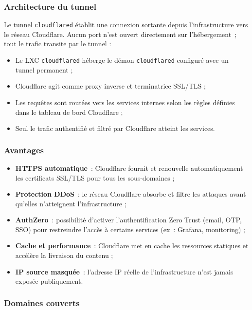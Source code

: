 \subsubsection{Architecture du tunnel}

Le tunnel \texttt{cloudflared} établit une connexion sortante depuis
l'infrastructure vers le réseau Cloudflare. Aucun port n'est ouvert
directement sur l'hébergement~; tout le trafic transite par le tunnel :

\begin{itemize}
  \item Le LXC \texttt{cloudflared} héberge le démon \texttt{cloudflared}
    configuré avec un tunnel permanent ;
  \item Cloudflare agit comme proxy inverse et terminatrice SSL/TLS ;
  \item Les requêtes sont routées vers les services internes selon les
    règles définies dans le tableau de bord Cloudflare ;
  \item Seul le trafic authentifié et filtré par Cloudflare atteint les
    services.
\end{itemize}

\subsubsection{Avantages}

\begin{itemize}
  \item \textbf{HTTPS automatique}~: Cloudflare fournit et renouvelle
    automatiquement les certificats SSL/TLS pour tous les sous-domaines ;
  \item \textbf{Protection DDoS}~: le réseau Cloudflare absorbe et filtre
    les attaques avant qu'elles n'atteignent l'infrastructure ;
  \item \textbf{AuthZero}~: possibilité d'activer l'authentification
    Zero Trust (email, OTP, SSO) pour restreindre l'accès à certains
    services (ex~: Grafana, monitoring) ;
  \item \textbf{Cache et performance}~: Cloudflare met en cache les
    ressources statiques et accélère la livraison du contenu ;
  \item \textbf{IP source masquée}~: l'adresse IP réelle de
    l'infrastructure n'est jamais exposée publiquement.
\end{itemize}

\subsubsection{Domaines couverts}

